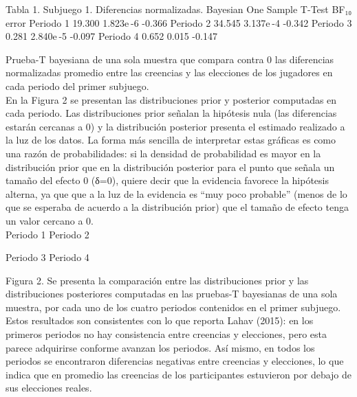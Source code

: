 Tabla 1. Subjuego 1. Diferencias normalizadas.
Bayesian One Sample T-Test 	
  	BF₁₀ 	error %
Periodo 1 		19.300 		1.823e -6 		-0.366 
Periodo 2 		34.545 		3.137e -4 		-0.342 
Periodo 3 		0.281 		2.840e -5 		-0.097 
Periodo 4 		0.652 		0.015 		-0.147 
	
Prueba-T bayesiana de una sola muestra que compara contra 0 las diferencias normalizadas promedio entre las creencias y las elecciones de los jugadores en cada periodo del primer subjuego.\\


En la Figura 2 se presentan las distribuciones prior y posterior computadas en cada periodo. Las distribuciones prior señalan la hipótesis nula (las diferencias estarán cercanas a 0) y la distribución posterior presenta el estimado realizado a la luz de los datos. La forma más sencilla de interpretar estas gráficas es como una razón de probabilidades: si la densidad de probabilidad es mayor en la distribución prior que en la distribución posterior para el punto que señala un tamaño del efecto 0 (δ=0), quiere decir que la evidencia favorece la hipótesis alterna, ya que que a la luz de la evidencia es “muy poco probable” (menos de lo que se esperaba de acuerdo a la distribución prior) que el tamaño de efecto tenga un valor cercano a 0.\\
  
Periodo 1				Periodo 2
  
Periodo 3				Periodo 4

Figura 2. Se presenta la comparación entre las distribuciones prior y las distribuciones posteriores computadas en las pruebas-T bayesianas de una sola muestra, por cada uno de los cuatro periodos contenidos en el primer subjuego.
Estos resultados son consistentes con lo que reporta Lahav (2015): en los primeros periodos no hay consistencia entre creencias y elecciones, pero esta parece adquirirse conforme avanzan los periodos. Así mismo, en todos los periodos se encontraron diferencias negativas entre creencias y elecciones, lo que indica que en promedio las creencias de los participantes estuvieron por debajo de sus elecciones reales.\\

